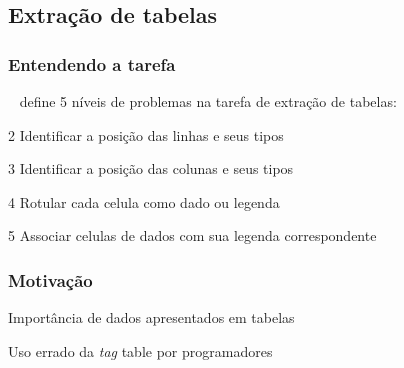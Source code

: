\documentclass{beamer}
\newenvironment{my_itemize}{
\begin{itemize}
  \setlength{\itemsep}{5pt}
  \setlength{\parskip}{2pt}
  \setlength{\parsep}{3pt}
}{\end{itemize}}
\begin{document}
\subsection{Extração de tabelas}

\begin{frame}
\frametitle{Entendendo a tarefa}%
~\cite{Pinto2003} define 5 níveis de problemas na tarefa de extração de
tabelas:

  \begin{my_itemize}

    \item[2] Identificar a posição das linhas e seus tipos
    \item[3] Identificar a posição das colunas e seus tipos
    \item[4] Rotular cada celula como dado ou legenda
    \item[5] Associar celulas de dados com sua legenda correspondente
  \end{my_itemize}
\end{frame}

\begin{frame}
\frametitle{Motivação}
  \begin{my_itemize}
    \item Importância de dados apresentados em tabelas
    \item Uso errado da \textit{tag} table por programadores
  \end{my_itemize}
\end{frame}
\end{document}
